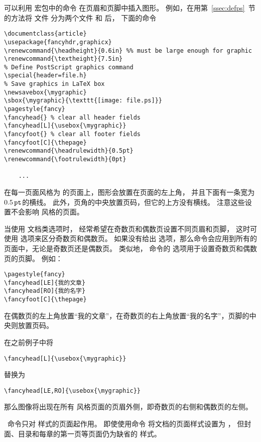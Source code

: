 可以利用  宏包中的命令
在页眉和页脚中插入图形。
例如，在用第~\ref{ssec:defps}~节的方法将  文件  分为两个文件  和  后，
下面的命令
\begin{lstlisting}
\documentclass{article}
\usepackage{fancyhdr,graphicx}
\renewcommand{\headheight}{0.6in} %% must be large enough for graphic
\renewcommand{\textheight}{7.5in}
% Define PostScript graphics command
\special{header=file.h}
% Save graphics in LaTeX box
\newsavebox{\mygraphic}
\sbox{\mygraphic}{\texttt{[image: file.ps]}}
\pagestyle{fancy}
\fancyhead{} % clear all header fields
\fancyhead[L]{\usebox{\mygraphic}}
\fancyfoot{} % clear all footer fields
\fancyfoot[C]{\thepage}
\renewcommand{\headrulewidth}{0.5pt}
\renewcommand{\footrulewidth}{0pt}

	...

\end{lstlisting}
在每一页面风格为  的页面上，图形会放置在页面的左上角，
并且下面有一条宽为 $0.5\,\mathtt{pt}$的横线。
此外，页角的中央放置页码，但它的上方没有横线。
注意这些设置不会影响  风格的页面。

当使用 \opt{[twoside]} 文档类选项时，
经常希望在奇数页和偶数页设置不同页眉和页脚，
这时可使用  选项来区分奇数页和偶数页。
如果没有给出  选项，那么命令会应用到所有的页面中，无论是奇数页还是偶数页。
类似地， 命令的  选项用于设置奇数页和偶数页的页脚。
例如：
\begin{lstlisting}
\pagestyle{fancy}
\fancyhead[LE]{我的文章}
\fancyhead[RO]{我的名字}
\fancyfoot[C]{\thepage}
\end{lstlisting}
在偶数页的左上角放置“我的文章”，在奇数页的右上角放置“我的名字”，页脚的中央则放置页码。

在之前例子中将
\begin{lstlisting}
\fancyhead[L]{\usebox{\mygraphic}}
\end{lstlisting}
替换为
\begin{lstlisting}
\fancyhead[LE,RO]{\usebox{\mygraphic}}
\end{lstlisting}
那么图像将出现在所有 风格页面的页眉外侧，即奇数页的右侧和偶数页的左侧。

~命令只对  样式的页面起作用。
即使使用命令  将文档的页面样式设置为 ，
但封面、目录和每章的第一页等页面仍为缺省的  样式。

